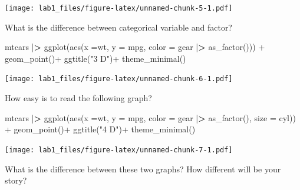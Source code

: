 \documentclass[
]{article}
\newenvironment{Shaded}{\begin{snugshade}}{\end{snugshade}}
\newcommand{\AttributeTok}[1]{\textcolor[rgb]{0.77,0.63,0.00}{#1}}
\newcommand{\ErrorTok}[1]{\textcolor[rgb]{0.64,0.00,0.00}{\textbf{#1}}}
\newcommand{\FunctionTok}[1]{\textcolor[rgb]{0.00,0.00,0.00}{#1}}
\newcommand{\NormalTok}[1]{#1}
\newcommand{\SpecialCharTok}[1]{\textcolor[rgb]{0.00,0.00,0.00}{#1}}
\newcommand{\StringTok}[1]{\textcolor[rgb]{0.31,0.60,0.02}{#1}}
\begin{document}
\texttt{[image: lab1\_files/figure-latex/unnamed-chunk-5-1.pdf]}

What is the difference between categorical variable and factor?

\begin{Shaded}
\begin{Highlighting}[]
\NormalTok{mtcars }\SpecialCharTok{|}\ErrorTok{\textgreater{}} 
\FunctionTok{ggplot}\NormalTok{(}\FunctionTok{aes}\NormalTok{(}\AttributeTok{x  =}\NormalTok{wt, }\AttributeTok{y =}\NormalTok{ mpg, }\AttributeTok{color =}\NormalTok{ gear }\SpecialCharTok{|}\ErrorTok{\textgreater{}} \FunctionTok{as\_factor}\NormalTok{())) }\SpecialCharTok{+}
  \FunctionTok{geom\_point}\NormalTok{()}\SpecialCharTok{+}
  \FunctionTok{ggtitle}\NormalTok{(}\StringTok{"3 D"}\NormalTok{)}\SpecialCharTok{+}
  \FunctionTok{theme\_minimal}\NormalTok{()}
\end{Highlighting}
\end{Shaded}

\texttt{[image: lab1\_files/figure-latex/unnamed-chunk-6-1.pdf]}

How easy is to read the following graph?

\begin{Shaded}
\begin{Highlighting}[]
\NormalTok{mtcars }\SpecialCharTok{|}\ErrorTok{\textgreater{}} 
\FunctionTok{ggplot}\NormalTok{(}\FunctionTok{aes}\NormalTok{(}\AttributeTok{x  =}\NormalTok{wt, }\AttributeTok{y =}\NormalTok{ mpg, }
           \AttributeTok{color =}\NormalTok{ gear }\SpecialCharTok{|}\ErrorTok{\textgreater{}} \FunctionTok{as\_factor}\NormalTok{(),}
           \AttributeTok{size =}\NormalTok{ cyl)) }\SpecialCharTok{+}
  \FunctionTok{geom\_point}\NormalTok{()}\SpecialCharTok{+}
  \FunctionTok{ggtitle}\NormalTok{(}\StringTok{"4 D"}\NormalTok{)}\SpecialCharTok{+}
  \FunctionTok{theme\_minimal}\NormalTok{()}
\end{Highlighting}
\end{Shaded}

\texttt{[image: lab1\_files/figure-latex/unnamed-chunk-7-1.pdf]}

What is the difference between these two graphs? How different will be
your story?
\end{document}

